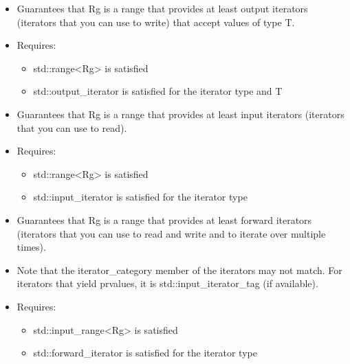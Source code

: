
\begin{itemize}
\item
Guarantees that Rg is a range that provides at least output iterators (iterators that you can use to write) that accept values of type T.

\item
Requires:

\begin{itemize}
\item
std::range<Rg> is satisfied

\item
std::output\_iterator is satisfied for the iterator type and T
\end{itemize}
\end{itemize}



\begin{itemize}
\item
Guarantees that Rg is a range that provides at least input iterators (iterators that you can use to read).

\item
Requires:

\begin{itemize}
\item
std::range<Rg> is satisfied

\item
std::input\_iterator is satisfied for the iterator type
\end{itemize}
\end{itemize}


\begin{itemize}
\item
Guarantees that Rg is a range that provides at least forward iterators (iterators that you can use to read and write and to iterate over multiple times).

\item
Note that the iterator\_category member of the iterators may not match. For iterators that yield prvalues, it is std::input\_iterator\_tag (if available).

\item
Requires:

\begin{itemize}
\item
std::input\_range<Rg> is satisfied

\item
std::forward\_iterator is satisfied for the iterator type
\end{itemize}
\end{itemize}

